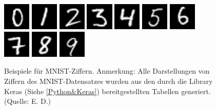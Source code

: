 \documentclass[
	a4paper,
	12pt,
	ngerman,
	oneside
]{scrreprt}											%
\begin{document}
			\begin{figure}[h]\label{MNISTbeispiele}
				\vspace{0.0cm} \centering
				\includegraphics[height=1.3cm]{imagesAndGraphData/mnistBeispiele/4080.png}
				\includegraphics[height=1.3cm]{imagesAndGraphData/mnistBeispiele/6329.png}
				\includegraphics[height=1.3cm]{imagesAndGraphData/mnistBeispiele/922.png}
				\includegraphics[height=1.3cm]{imagesAndGraphData/mnistBeispiele/270.png}
				\includegraphics[height=1.3cm]{imagesAndGraphData/mnistBeispiele/56.png}
				\includegraphics[height=1.3cm]{imagesAndGraphData/mnistBeispiele/253.png}
				\includegraphics[height=1.3cm]{imagesAndGraphData/mnistBeispiele/21.png}
				\includegraphics[height=1.3cm]{imagesAndGraphData/mnistBeispiele/4225.png}
				\includegraphics[height=1.3cm]{imagesAndGraphData/mnistBeispiele/6275.png}
				\includegraphics[height=1.3cm]{imagesAndGraphData/mnistBeispiele/560.png}
				\caption{Beispiele für MNIST-Ziffern. Anmerkung: Alle Darstellungen von Ziffern des MNIST-Datensatzes wurden aus den durch die Library Keras (Siehe \ref{Python&Keras}) bereitgestellten Tabellen generiert. (Quelle: E. D.)}
			\end{figure}
		
\end{document}
